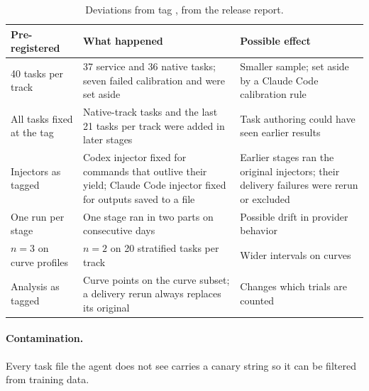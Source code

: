 \begin{table}[t]
\centering
\small
\begin{tabular}{p{3.6cm}p{4.6cm}p{5.2cm}}
\toprule
Pre-registered & What happened & Possible effect \\
\midrule
40 tasks per track & 37 service and 36 native tasks; seven failed calibration and were set aside & Smaller sample; set aside by a Claude Code calibration rule \\
All tasks fixed at the tag & Native-track tasks and the last 21 tasks per track were added in later stages & Task authoring could have seen earlier results \\
Injectors as tagged & Codex injector fixed for commands that outlive their yield; Claude Code injector fixed for outputs saved to a file & Earlier stages ran the original injectors; their delivery failures were rerun or excluded \\
One run per stage & One stage ran in two parts on consecutive days & Possible drift in provider behavior \\
$n = 3$ on curve profiles & $n = 2$ on 20 stratified tasks per track & Wider intervals on curves \\
Analysis as tagged & Curve points on the curve subset; a delivery rerun always replaces its original & Changes which trials are counted \\
\bottomrule
\end{tabular}
\caption{Deviations from tag , from the release report.}
\label{tab:deviations}
\end{table}

\paragraph{Contamination.}
Every task file the agent does not see carries a canary string so it can be filtered from training data.

